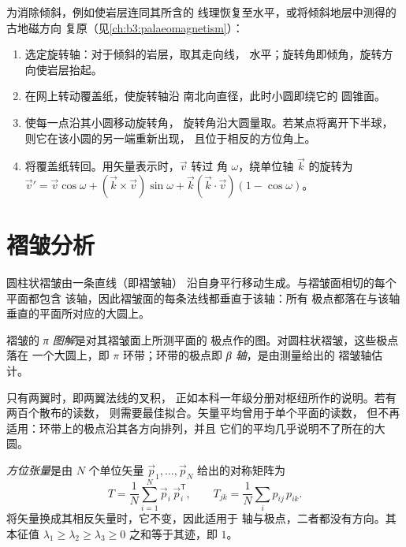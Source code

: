 \begin{method}[绕轴旋转数据]\label{met:b3:structural-analysis:rotation}
为消除倾斜，例如使岩层连同其所含的
线理恢复至水平，或将倾斜地层中测得的古地磁方向
复原（见\cref{ch:b3:palaeomagnetism}）：
\begin{enumerate}
  \item 选定旋转轴：对于倾斜的岩层，取其走向线，
        水平；旋转角即倾角，旋转方向使岩层抬起。
  \item 在网上转动覆盖纸，使旋转轴沿
        南北向直径，此时小圆即绕它的
        圆锥面。
  \item 使每一点沿其小圆移动旋转角，
        旋转角沿大圆量取。若某点将离开下半球，
        则它在该小圆的另一端重新出现，
        且位于相反的方位角上。
  \item 将覆盖纸转回。用矢量表示时，$\vec v$ 转过
        角 $\omega$，绕单位轴 $\vec k$ 的旋转为 $\vec v' = \vec v
        \cos\omega + (\vec k\times\vec v)\sin\omega + \vec k(\vec k\cdot\vec
        v)(1 - \cos\omega)$。
\end{enumerate}
\end{method}

\section{褶皱分析}\label{sec:b3:structural-analysis:folds}

圆柱状褶皱由一条直线（即褶皱轴）
沿自身平行移动生成。与褶皱面相切的每个平面都包含
该轴，因此褶皱面的每条法线都垂直于该轴：所有
极点都落在与该轴垂直的平面所对应的大圆上。

\begin{definition}[π 图解、β 轴]\label{def:b3:structural-analysis:pi}
褶皱的 \emph{π 图解}是对其褶皱面上所测平面的
极点作的图。对圆柱状褶皱，这些极点落在
一个大圆上，即 $\pi$ 环带；环带的极点即
\emph{β 轴}，是由测量给出的
褶皱轴估计。
\end{definition}

只有两翼时，即两翼法线的叉积，
正如本科一年级分册对枢纽所作的说明。若有两百个散布的读数，
则需要最佳拟合。矢量平均曾用于单个平面的读数，
但不再适用：环带上的极点沿其各方向排列，并且
它们的平均几乎说明不了所在的大圆。

\begin{definition}[方位张量]\label{def:b3:structural-analysis:orientation-tensor}
\emph{方位张量}是由 $N$ 个单位矢量
$\vec p_1, \dots, \vec p_N$ 给出的对称矩阵为
\[
  T = \frac1N\sum_{i=1}^N \vec p_i\,\vec p_i^{\mathsf T},
  \qquad T_{jk} = \frac1N\sum_i p_{ij}\,p_{ik} .
\]
将矢量换成其相反矢量时，它不变，因此适用于
轴与极点，二者都没有方向。其本征值 $\lambda_1 \ge \lambda_2
\ge \lambda_3 \ge 0$ 之和等于其迹，即 $1$。
\end{definition}

